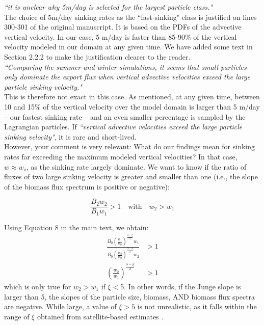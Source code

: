 \documentclass[12pt,letter]{article}
\begin{document}
\textit{``it is unclear why 5m/day is selected for the largest particle class."\\}
The choice of 5m/day sinking rates as the ``fast-sinking"  class is justified on lines 300-301 of the original manuscript. It is based on the PDFs of the advective vertical velocity. In our case, 5 m/day is faster than 85-90\% of the vertical velocity modeled in our domain at any given time. We have added some text in Section 2.2.2 to make the justification clearer to the reader.\\

\textit{``Comparing the summer and winter simulations, it seems that small particles only dominate the export flux when vertical advective velocities exceed the large particle sinking velocity."\\}
This is therefore not exact in this case. As mentioned, at any given time, between 10 and 15\% of the vertical velocity over the model domain is larger than 5 m/day -- our fastest sinking rate -- and an even smaller percentage is sampled by the Lagrangian particles. If \textit{``vertical advective velocities exceed the large particle sinking velocity"}, it is rare and short-lived.\\

However, your comment is very relevant: What do our findings mean for sinking rates far exceeding the maximum modeled vertical velocities? In that case, $w \approx w_s$, as the sinking rate largely dominate. We want to know if the ratio of fluxes of two large sinking velocity is greater and smaller than one (i.e., the slope of the biomass flux spectrum is positive or negative):

\begin{equation}
	\frac{B_2w_2}{B_1w_1} >1 \quad \text{with} \quad w_2 > w_1
\end{equation}	

Using Equation 8 in the main text, we obtain:
\begin{align}
	\frac{B_0\left(\frac{w_1}{w_0}\right)^{\frac{3-\xi}{2}}w_1}{B_0\left(\frac{w_2}{w_0}\right)^{\frac{3-\xi}{2}}w_2} &> 1\\[.2cm]
	\left(\frac{w_2}{w_1}\right)^{\frac{5-\xi}{2}} &>1
\end{align}	
which is only true for $w_2 > w_1$ if $\xi<$5. In other words, if the Junge slope is larger than 5, the slopes of the particle size, biomass, AND biomass flux spectra are negative. While large, a value of $\xi>5$ is not unrealistic, as it falls within the range of $\xi$ obtained from satellite-based estimates \citep{Kostadinov_2009}.
\end{document}
